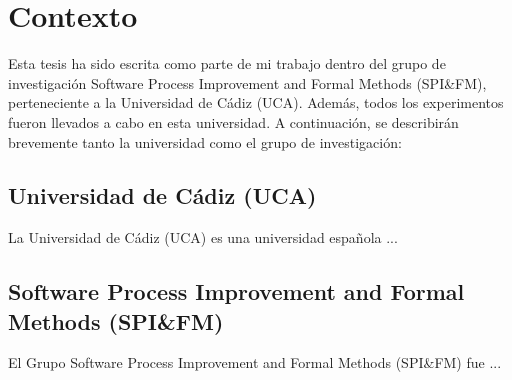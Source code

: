 
\section{Contexto}
\label{sec:contexto}






Esta tesis ha sido escrita como parte de mi trabajo dentro del grupo de investigación Software Process Improvement and Formal Methods (SPI\&FM), perteneciente a la Universidad de Cádiz (UCA). Además, todos los experimentos fueron llevados a cabo en esta universidad. A continuación, se describirán brevemente tanto la universidad como el grupo de investigación:

\subsection{Universidad de Cádiz (UCA)}

La Universidad de Cádiz (UCA) es una universidad española ...

\subsection{Software Process Improvement and Formal Methods (SPI\&FM)}

El Grupo Software Process Improvement and Formal Methods (SPI\&FM) fue ...
